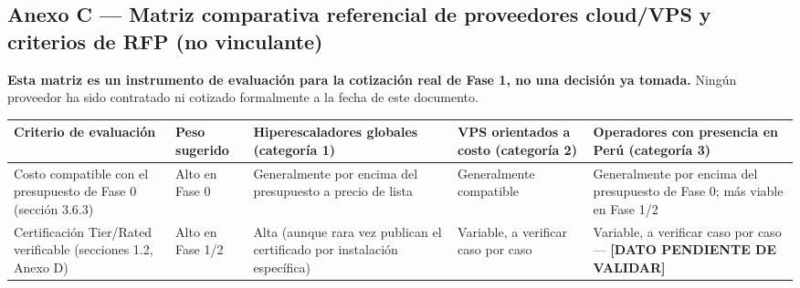 \documentclass[11pt,a4paper]{article}
\begin{document}
\subsection{Anexo C --- Matriz comparativa referencial de proveedores cloud/VPS y criterios de RFP (no vinculante)}\label{anexo-c-matriz-comparativa-referencial-de-proveedores-cloudvps-y-criterios-de-rfp-no-vinculante}

\textbf{Esta matriz es un instrumento de evaluación para la cotización real de Fase 1, no una decisión ya tomada.} Ningún proveedor ha sido contratado ni cotizado formalmente a la fecha de este documento.

{\small
\begin{longtable}[]{@{}
  >{\raggedright\arraybackslash}p{}
  >{\raggedright\arraybackslash}p{}
  >{\raggedright\arraybackslash}p{}
  >{\raggedright\arraybackslash}p{}
  >{\raggedright\arraybackslash}p{}@{}}
\toprule\noalign{}
\begin{minipage}[b]{\linewidth}\raggedright
Criterio de evaluación
\end{minipage} & \begin{minipage}[b]{\linewidth}\raggedright
Peso sugerido
\end{minipage} & \begin{minipage}[b]{\linewidth}\raggedright
Hiperescaladores globales (categoría 1)
\end{minipage} & \begin{minipage}[b]{\linewidth}\raggedright
VPS orientados a costo (categoría 2)
\end{minipage} & \begin{minipage}[b]{\linewidth}\raggedright
Operadores con presencia en Perú (categoría 3)
\end{minipage} \\
\midrule\noalign{}
\endhead
\bottomrule\noalign{}
\endlastfoot
Costo compatible con el presupuesto de Fase 0 (sección 3.6.3) & Alto en Fase 0 & Generalmente por encima del presupuesto a precio de lista & Generalmente compatible & Generalmente por encima del presupuesto de Fase 0; más viable en Fase 1/2 \\
Certificación Tier/Rated verificable (secciones 1.2, Anexo D) & Alto en Fase 1/2 & Alta (aunque rara vez publican el certificado por instalación específica) & Variable, a verificar caso por caso & Variable, a verificar caso por caso --- \textbf{{[}DATO PENDIENTE DE VALIDAR{]}} \\

\end{longtable}}
\end{document}
